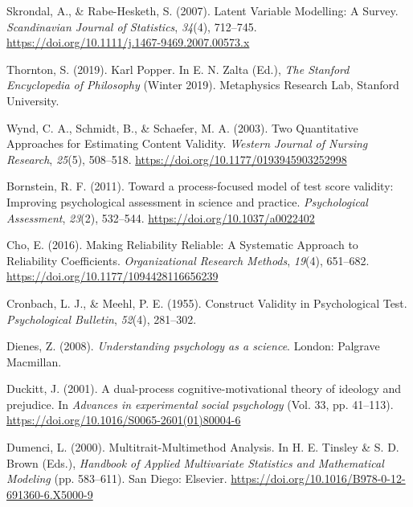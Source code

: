 \documentclass[
  english,
  man]{apa6}
\begin{document}
\leavevmode\hypertarget{ref-skrondalLatentVariableModelling2007}{}%
Skrondal, A., \& Rabe-Hesketh, S. (2007). Latent Variable Modelling: A Survey. \emph{Scandinavian Journal of Statistics}, \emph{34}(4), 712--745. \url{https://doi.org/10.1111/j.1467-9469.2007.00573.x}

\leavevmode\hypertarget{ref-thorntonKarlPopper2019}{}%
Thornton, S. (2019). Karl Popper. In E. N. Zalta (Ed.), \emph{The Stanford Encyclopedia of Philosophy} (Winter 2019). Metaphysics Research Lab, Stanford University.

\leavevmode\hypertarget{ref-wyndTwoQuantitativeApproaches2003}{}%
Wynd, C. A., Schmidt, B., \& Schaefer, M. A. (2003). Two Quantitative Approaches for Estimating Content Validity. \emph{Western Journal of Nursing Research}, \emph{25}(5), 508--518. \url{https://doi.org/10.1177/0193945903252998}

\leavevmode\hypertarget{ref-bornsteinProcessfocusedModelTest2011}{}%
Bornstein, R. F. (2011). Toward a process-focused model of test score validity: Improving psychological assessment in science and practice. \emph{Psychological Assessment}, \emph{23}(2), 532--544. \url{https://doi.org/10.1037/a0022402}

\leavevmode\hypertarget{ref-choMakingReliabilityReliable2016}{}%
Cho, E. (2016). Making Reliability Reliable: A Systematic Approach to Reliability Coefficients. \emph{Organizational Research Methods}, \emph{19}(4), 651--682. \url{https://doi.org/10.1177/1094428116656239}

\leavevmode\hypertarget{ref-cronbachConstructValidityPsychological1955}{}%
Cronbach, L. J., \& Meehl, P. E. (1955). Construct Validity in Psychological Test. \emph{Psychological Bulletin}, \emph{52}(4), 281--302.

\leavevmode\hypertarget{ref-dienesUnderstandingPsychologyScience2008}{}%
Dienes, Z. (2008). \emph{Understanding psychology as a science}. London: Palgrave Macmillan.

\leavevmode\hypertarget{ref-Duckitt2001}{}%
Duckitt, J. (2001). A dual-process cognitive-motivational theory of ideology and prejudice. In \emph{Advances in experimental social psychology} (Vol. 33, pp. 41--113). \url{https://doi.org/10.1016/S0065-2601(01)80004-6}

\leavevmode\hypertarget{ref-dumenciMultitraitMultimethodAnalysis2000}{}%
Dumenci, L. (2000). Multitrait-Multimethod Analysis. In H. E. Tinsley \& S. D. Brown (Eds.), \emph{Handbook of Applied Multivariate Statistics and Mathematical Modeling} (pp. 583--611). San Diego: Elsevier. \url{https://doi.org/10.1016/B978-0-12-691360-6.X5000-9}
\end{document}
